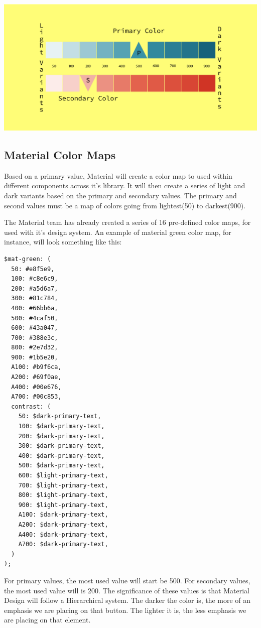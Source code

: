 \includegraphics[width=414pt]{design-language-system/material-overrides/material-design-palette_pt.pdf}

\subsection{Material Color Maps}

Based on a primary value, Material will create a color map to used within 
different components across it's library. It will then create a series of light
and dark variants based on the primary and secondary values. The primary and 
second values must be a map of colors going from lightest(50) to darkest(900).

The Material team has already created a series of 16 pre-defined color maps, 
for used with it's design system. An example of material green color map, for
instance, will look something like this: 
\begin{lstlisting}
$mat-green: (
  50: #e8f5e9,
  100: #c8e6c9,
  200: #a5d6a7,
  300: #81c784,
  400: #66bb6a,
  500: #4caf50,
  600: #43a047,
  700: #388e3c,
  800: #2e7d32,
  900: #1b5e20,
  A100: #b9f6ca,
  A200: #69f0ae,
  A400: #00e676,
  A700: #00c853,
  contrast: (
    50: $dark-primary-text,
    100: $dark-primary-text,
    200: $dark-primary-text,
    300: $dark-primary-text,
    400: $dark-primary-text,
    500: $dark-primary-text,
    600: $light-primary-text,
    700: $light-primary-text,
    800: $light-primary-text,
    900: $light-primary-text,
    A100: $dark-primary-text,
    A200: $dark-primary-text,
    A400: $dark-primary-text,
    A700: $dark-primary-text,
  )
);
\end{lstlisting}

For primary values, the most used value will start be 500. For secondary values, 
the most used value will is 200. The significance of these values is that
Material Design will follow a Hierarchical system. The darker the color is, the 
more of an emphasis we are placing on that button. The lighter it is, the less 
emphasis we are placing on that element. 

